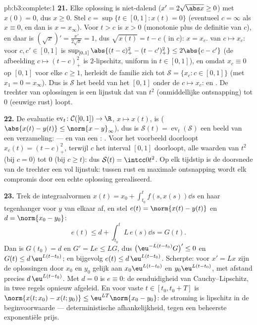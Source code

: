 \begin{solution}{pb:b3:complete:1}
\textbf{21.} Elke oplossing is niet-dalend ($x' = 2\sqrt{\abs x}
\geq 0$) met $x(0) = 0$, dus $x \geq 0$. Stel $c = \sup\{t \in
[0,1] : x(t) = 0\}$ (eventueel $c = \infty$ als $x \equiv 0$, en
dan is $x = x_\infty$). Voor $t > c$ is $x > 0$ (monotonie plus de
definitie van $c$), en daar is $(\sqrt x)' = \frac{x'}{2\sqrt x} =
1$, dus $\sqrt{x(t)} = t - c$ ( in $c$): $x = x_c$.
 van $c \mapsto x_c$: voor $c, c' \in [0, 1]$ is
$\sup_{[0,1]}\abs{(t - c)_+^2 - (t - c')_+^2} \leq 2\abs{c - c'}$
(de afbeelding $c \mapsto (t-c)_+^2$ is $2$-lipschitz, uniform in
$t \in [0,1]$), en omdat $x_c \equiv 0$ op $[0,1]$ voor elke $c
\geq 1$, herleidt de familie zich tot $\mathcal S = \{x_c : c \in
[0,1]\}$ (met $x_1 = 0 = x_\infty$). Dus is $\mathcal S$ het beeld
van het   $[0,1]$ onder de  $c \mapsto x_c$:  en . De trechter
van oplossingen is een  lijnstuk dat van $t^2$ (onmiddellijke
ontsnapping) tot $0$ (eeuwige rust) loopt.

\textbf{22.} De evaluatie $\operatorname{ev}_t\colon \mathcal
C([0,1]) \to \R$, $x \mapsto x(t)$, is  ($\abs{x(t) -
y(t)} \leq \norm{x - y}_\infty$), dus is $\mathcal S(t) =
\operatorname{ev}_t(\mathcal S)$ een  beeld van een
 verzameling:  --- en van een :
. Voor het voorbeeld doorloopt $x_c(t) = (t - c)_+^2$,
terwijl $c$ het interval $[0, 1]$ doorloopt,  alle waarden
van $t^2$ (bij $c = 0$) tot $0$ (bij $c \geq t$): dus $\mathcal
S(t) = \intcc0{t^2}$. Op elk tijdstip is de doorsnede van de
trechter een vol lijnstuk: tussen rust en maximale ontsnapping
wordt elk compromis door een echte oplossing gerealiseerd.

\textbf{23.} Trek de integraalvormen $x(t) = x_0 +
\int_{t_0}^tf(s, x(s))\dd s$ en haar tegenhanger voor $y$ van
elkaar af, en stel $e(t) = \norm{x(t) - y(t)}$ en $d = \norm{x_0 -
y_0}$:
\[
e(t) \leq d + \int_{t_0}^tL\,e(s)\dd s = G(t).
\]
Dan is $G(t_0) = d$ en $G' = Le \leq LG$, dus $\bigl(\eu^{-L(t -
t_0)}G\bigr)' \leq 0$ en $G(t) \leq d\,\eu^{L(t - t_0)}$; en
bijgevolg $e(t) \leq d\,\eu^{L(t-t_0)}$. Scherpte: voor $x' = Lx$
zijn de oplossingen door $x_0$ en $y_0$ gelijk aan
$x_0\eu^{L(t - t_0)}$ en $y_0\eu^{L(t-t_0)}$, met afstand precies
$d\,\eu^{L(t-t_0)}$. Met $d = 0$ is $e \equiv 0$: de eenduidigheid
van Cauchy--Lipschitz, in twee regels opnieuw afgeleid. En voor
vaste $t \in [t_0, t_0 + T]$ is $\norm{x(t; x_0) - x(t; y_0)} \leq
\eu^{LT}\norm{x_0 - y_0}$: de stroming is lipschitz in de
beginvoorwaarde --- deterministische afhankelijkheid, tegen een
beheerste exponentiële prijs.


\end{solution}
